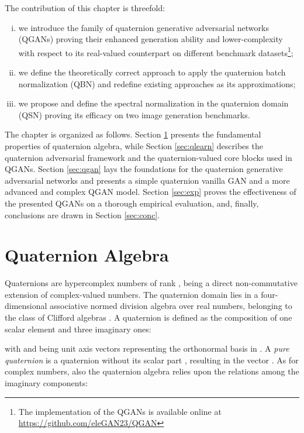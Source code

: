\documentclass[graybox]{svmult}
\begin{document}
The contribution of this chapter is threefold: 
\begin{enumerate}[i)]
    \item we introduce the family of quaternion generative adversarial networks (QGANs) proving their enhanced generation ability and lower-complexity with respect to its real-valued counterpart on different benchmark datasets\footnote{The implementation of the QGANs is available online at \url{https://github.com/eleGAN23/QGAN}};
    \item we define the theoretically correct approach to apply the quaternion batch normalization (QBN) and redefine existing approaches as its approximations; 
    \item we propose and define the spectral normalization in the quaternion domain (QSN) proving its efficacy on two image generation benchmarks.
\end{enumerate}

The chapter is organized as follows. Section \ref{sec:qalg} presents the fundamental properties of quaternion algebra, while Section \ref{sec:qlearn} describes the quaternion adversarial framework and the quaternion-valued core blocks used in QGANs. Section \ref{sec:qgan} lays the foundations for the quaternion generative adversarial networks and presents a simple quaternion vanilla GAN and a more advanced and complex QGAN model. Section \ref{sec:exp} proves the effectiveness of the presented QGANs on a thorough empirical evaluation, and, finally, conclusions are drawn in Section \ref{sec:conc}.


\section{Quaternion Algebra}
\label{sec:qalg}
\noindent Quaternions are hypercomplex numbers of rank , being a direct non-commutative extension of complex-valued numbers. The quaternion domain  lies in a four-dimensional associative normed division algebra over real numbers, belonging to the class of Clifford algebras \cite{Ward1997}.
A quaternion is defined as the composition of one scalar element and three imaginary ones:



\noindent with  and being  unit axis vectors representing the orthonormal basis in . A \textit{pure quaternion} is a quaternion without its scalar part , resulting in the vector . As for complex numbers, also the quaternion algebra relies upon the relations among the imaginary components:
\end{document}
